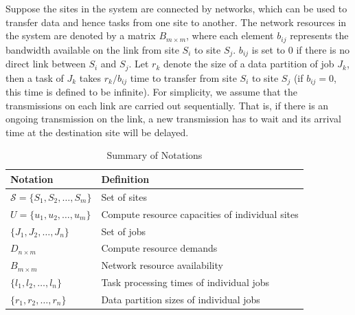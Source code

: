 Suppose the sites in the system are connected by networks, which can be used to transfer data and hence tasks from one site to another. The network resources in the system are denoted by a matrix $B_{m \times m}$, where each element $b_{ij}$ represents the bandwidth available on the link from site $S_i$ to site $S_j$. $b_{ij}$ is set to 0 if there is no direct link between $S_i$ and $S_j$. Let $r_k$ denote the size of a data partition of job $J_k$, then a task of $J_k$ takes $r_k/b_{ij}$ time to transfer from site $S_i$ to site $S_j$ (if $b_{ij}=0$, this time is defined to be infinite). For simplicity, we assume that the transmissions on each link are carried out sequentially. That is, if there is an ongoing transmission on the link, a new transmission has to wait and its arrival time at the destination site will be delayed.
\begin{table}[t]
  \caption{Summary of Notations}
  \label{tab4:Notation}
  \centering
  \begin{tabularx}{\linewidth}{lX}
    \toprule
    \textbf{Notation} & \textbf{Definition} \\
    \midrule
    $\mathcal{S} = \{S_1, S_2, \dots, S_m\}$ & Set of sites \\
    $U=\{u_1, u_2, \dots, u_m\}$ & Compute resource capacities of individual sites \\
    $\{J_1, J_2, \dots, J_n\}$ & Set of jobs \\
    $D_{n \times m}$ & Compute resource demands \\
    $B_{m \times m}$ & Network resource availability \\
    $\{l_1, l_2, \dots, l_n\}$ & Task processing times of individual jobs \\
    $\{r_1, r_2, \dots, r_n\}$ & Data partition sizes of individual jobs \\
    \bottomrule
  \end{tabularx}
\end{table}

